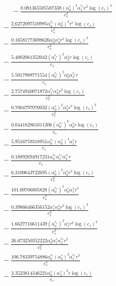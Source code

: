 \documentclass[10pt]{article}
\begin{document}
\begin{align*}
\phantom{R_{2,8}} &\phantom{={}}{}  - \frac{0.081365505587338 \left(\alpha_{0}^s\right)^{4} \alpha_{1}^{c_s} r^{2} \log{\left(c_{s} \right)}^{4}}{c_{s}^{2}} \\
&{}  - \frac{2.6272097510995 \alpha_{0}^{c_s} \left(\alpha_{0}^s\right)^{2} r^{5} \log{\left(c_{s} \right)}}{c_{s}^{5}} \\
&{}  - \frac{0.16581773698626 \alpha_{0}^s \alpha_{4}^s r^{2} \log{\left(c_{s} \right)}^{3}}{c_{s}^{2}} \\
&{}  - \frac{5.4002061352042 \left(\alpha_{1}^{c_s}\right)^{2} \alpha_{2}^s r \log{\left(c_{s} \right)}}{c_{s}} \\
&{}  - \frac{5.5017988771554 \left(\alpha_{0}^{c_s}\right)^{2} \alpha_{0}^s \alpha_{3}^{c_s} r}{c_{s}} \\
&{}  - \frac{2.7574940071872 \alpha_{1}^{c_s} \alpha_{3}^s r^{2} \log{\left(c_{s} \right)}}{c_{s}^{2}} \\
&{}  - \frac{0.7004797070032 \left(\alpha_{0}^s\right)^{2} \alpha_{2}^s r^{3} \log{\left(c_{s} \right)}^{3}}{c_{s}^{3}} \\
&{}  - \frac{0.044182861011306 \left(\alpha_{0}^{c_s}\right)^{6} \alpha_{0}^s r \log{\left(c_{s} \right)}}{c_{s}} \\
&{}  - \frac{5.9516759318951 \alpha_{0}^{c_s} \left(\alpha_{0}^s\right)^{4} \alpha_{1}^s r}{c_{s}} \\
&{}  - \frac{0.18892694917231 \alpha_{0}^{c_s} \alpha_{1}^{c_s} \alpha_{3}^{c_s} r}{c_{s}} \\
&{}  - \frac{6.3100643722695 \left(\alpha_{0}^s\right)^{2} \alpha_{2}^s r^{3} \log{\left(c_{s} \right)}}{c_{s}^{3}} \\
&{}  - \frac{101.00706805828 \left(\alpha_{0}^{c_s}\right)^{2} \alpha_{0}^s \alpha_{1}^s r^{3}}{c_{s}^{3}} \\
&{}  - \frac{0.39866466356152 \alpha_{1}^s \alpha_{3}^s r^{2} \log{\left(c_{s} \right)}^{3}}{c_{s}^{2}} \\
&{}  - \frac{1.6627716611439 \left(\alpha_{0}^{c_s}\right)^{3} \alpha_{1}^s r^{3} \log{\left(c_{s} \right)}^{2}}{c_{s}^{3}} \\
&{}  - \frac{26.673250352222 \alpha_{0}^s \alpha_{1}^s \alpha_{2}^{c_s} r^{2}}{c_{s}^{2}} \\
&{}  - \frac{106.78339754886 \alpha_{0}^{c_s} \left(\alpha_{0}^s\right)^{2} \alpha_{1}^{c_s} r^{3}}{c_{s}^{3}} \\
&{}  - \frac{3.3523814346221 \alpha_{0}^s \left(\alpha_{2}^s\right)^{2} r \log{\left(c_{s} \right)}}{c_{s}} \\

\end{align*}
\end{document}

